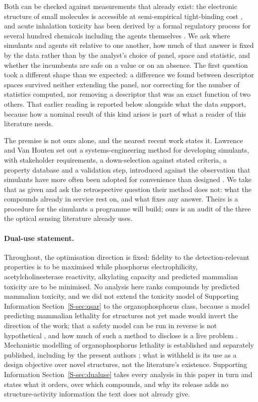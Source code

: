 \documentclass[journal=ancham,manuscript=article,margin=1in]{achemso}
\begin{document}
Both can be checked against measurements that already exist: the electronic
structure of small molecules is accessible at semi-empirical tight-binding cost
\cite{gfnxtb2017,bannwarth2019}, and acute inhalation toxicity has been derived
by a formal regulatory process for several hundred chemicals including the
agents themselves \cite{watson2006}. We ask where simulants and agents sit
relative to one another, how much of that answer is fixed by the data rather
than by the analyst's choice of panel, space and statistic, and whether the
incumbents are safe on a value or on an absence. The first question took a
different shape than we expected: a difference we found between descriptor
spaces survived neither extending the panel, nor correcting for the number of
statistics computed, nor removing a descriptor that was an exact function of two
others. That earlier reading is reported below alongside what the data support,
because how a nominal result of this kind arises is part of what a reader of
this literature needs.

The premise is not ours alone, and the nearest recent work states it. Lawrence
and Van Houten set out a systems-engineering method for developing simulants,
with stakeholder requirements, a down-selection against stated criteria, a
property database and a validation step, introduced against the observation that
simulants have more often been adopted for convenience than designed
\cite{lawrence2025simulants}. We take that as given and ask the retrospective
question their method does not: what the compounds already in service rest on,
and what fixes any answer. Theirs
is a procedure for the simulants a programme will build; ours is an audit of the
three the optical sensing literature already uses.

\paragraph{Dual-use statement.} Throughout, the optimisation direction is
fixed: fidelity to the detection-relevant properties is to be maximised while
phosphorus electrophilicity, acetylcholinesterase reactivity, alkylating
capacity and predicted mammalian toxicity are to be minimised. No analysis here
ranks compounds by predicted mammalian toxicity, and we did not extend the
toxicity model of Supporting Information Section~\ref{S-sec:qsar} to the
organophosphorus class, because a model predicting mammalian lethality for
structures not yet made would invert the direction of the work; that a safety
model can be run in reverse is not hypothetical \cite{urbina2022}, and how much
of such a method to disclose is a live problem \cite{cbrndisclose}. Mechanistic
modelling of organophosphorus lethality is established and separately published,
including by the present authors \cite{qsarld50}; what is withheld is its use as
a design objective over novel structures, not the literature's existence.
Supporting Information Section~\ref{S-sec:dualuse} takes every analysis in this
paper in turn and states what it orders, over which compounds, and why its
release adds no structure-activity information the text does not already give.
\end{document}
